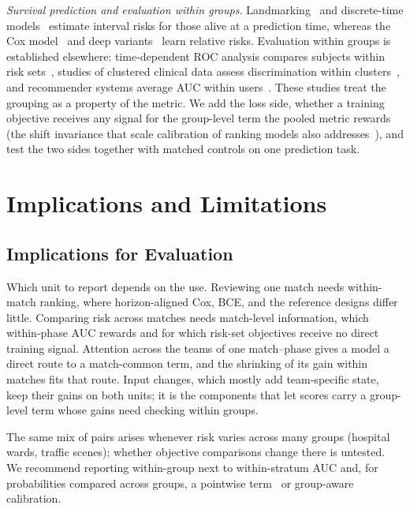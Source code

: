 \documentclass[sigconf,anonymous]{acmart}
\begin{document}
\emph{Survival prediction and evaluation within groups.} Landmarking~\cite{vanHouwelingen07} and discrete-time models~\cite{SingerWillett93,Gensheimer19} estimate interval risks for those alive at a prediction time, whereas the Cox model~\cite{Cox72} and deep variants~\cite{DeepHit18,DynamicDeepHit20} learn relative risks. Evaluation within groups is established elsewhere: time-dependent ROC analysis compares subjects within risk sets~\cite{HeagertyZheng05}, studies of clustered clinical data assess discrimination within clusters~\cite{vanKlaveren14}, and recommender systems average AUC within users~\cite{Zhou18}. These studies treat the grouping as a property of the metric. We add the loss side, whether a training objective receives any signal for the group-level term the pooled metric rewards (the shift invariance that scale calibration of ranking models also addresses~\cite{Yan22}), and test the two sides together with matched controls on one prediction task.

\section{Implications and Limitations}
\label{sec:discussion}
\subsection{Implications for Evaluation}
\label{sec:discussion:implications}
Which unit to report depends on the use. Reviewing one match needs within-match ranking, where horizon-aligned Cox, BCE, and the reference designs differ little. Comparing risk across matches needs match-level information, which within-phase AUC rewards and for which risk-set objectives receive no direct training signal. Attention across the teams of one match--phase gives a model a direct route to a match-common term, and the shrinking of its gain within matches fits that route. Input changes, which mostly add team-specific state, keep their gains on both units; it is the components that let scores carry a group-level term whose gains need checking within groups.

The same mix of pairs arises whenever risk varies across many groups (hospital wards, traffic scenes); whether objective comparisons change there is untested. We recommend reporting within-group next to within-stratum AUC and, for probabilities compared across groups, a pointwise term~\cite{Bai23} or group-aware calibration.
\end{document}
